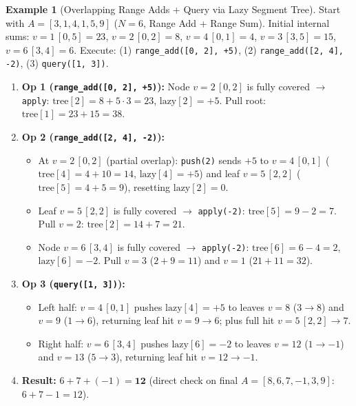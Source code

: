 \documentclass[11pt,a4paper]{article}
\theoremstyle{definition}
\newtheorem{example}{Example}[section]
\begin{document}
\begin{example}[Overlapping Range Adds + Query via Lazy Segment Tree]
Start with $A = [3, 1, 4, 1, 5, 9]$ ($N = 6$, Range Add + Range Sum). Initial internal sums: $v=1\,[0,5]=23$, $v=2\,[0,2]=8$, $v=4\,[0,1]=4$, $v=3\,[3,5]=15$, $v=6\,[3,4]=6$. Execute: (1) \texttt{range\_add([0, 2], +5)}, (2) \texttt{range\_add([2, 4], -2)}, (3) \texttt{query([1, 3])}.
\begin{enumerate}[itemsep=2pt, topsep=2pt]
    \item \textbf{Op 1 (\texttt{range\_add([0, 2], +5)}):} Node $v = 2\,[0, 2]$ is fully covered $\to$ \texttt{apply}: $\text{tree}[2] = 8 + 5 \cdot 3 = 23$, $\text{lazy}[2] = +5$. Pull root: $\text{tree}[1] = 23 + 15 = 38$.
    \item \textbf{Op 2 (\texttt{range\_add([2, 4], -2)}):}
    \begin{itemize}[itemsep=1pt, topsep=1pt]
        \item At $v = 2\,[0, 2]$ (partial overlap): \texttt{push(2)} sends $+5$ to $v = 4\,[0, 1]$ ($\text{tree}[4] = 4 + 10 = 14$, $\text{lazy}[4] = +5$) and leaf $v = 5\,[2, 2]$ ($\text{tree}[5] = 4 + 5 = 9$), resetting $\text{lazy}[2] = 0$.
        \item Leaf $v = 5\,[2, 2]$ is fully covered $\to$ \texttt{apply(-2)}: $\text{tree}[5] = 9 - 2 = 7$. Pull $v = 2$: $\text{tree}[2] = 14 + 7 = 21$.
        \item Node $v = 6\,[3, 4]$ is fully covered $\to$ \texttt{apply(-2)}: $\text{tree}[6] = 6 - 4 = 2$, $\text{lazy}[6] = -2$. Pull $v = 3$ ($2 + 9 = 11$) and $v = 1$ ($21 + 11 = 32$).
    \end{itemize}
    \item \textbf{Op 3 (\texttt{query([1, 3])}):}
    \begin{itemize}[itemsep=1pt, topsep=1pt]
        \item Left half: $v = 4\,[0, 1]$ pushes $\text{lazy}[4] = +5$ to leaves $v = 8$ ($3 \to 8$) and $v = 9$ ($1 \to 6$), returning leaf hit $v = 9 \to 6$; plus full hit $v = 5\,[2, 2] \to 7$.
        \item Right half: $v = 6\,[3, 4]$ pushes $\text{lazy}[6] = -2$ to leaves $v = 12$ ($1 \to -1$) and $v = 13$ ($5 \to 3$), returning leaf hit $v = 12 \to -1$.
    \end{itemize}
    \item \textbf{Result:} $6 + 7 + (-1) = \mathbf{12}$ (direct check on final $A = [8, 6, 7, -1, 3, 9]$: $6 + 7 - 1 = 12$).
\end{enumerate}
\end{example}
\end{document}
